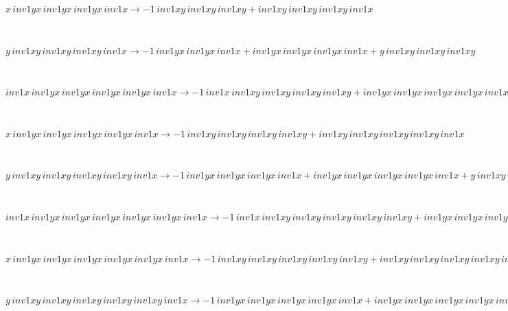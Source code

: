 \begin{minipage}{6in}
$
x\,
 inv1yx\,
 inv1yx\,
 inv1yx\,
 inv1x\rightarrow -1\,
 inv1xy\,
 inv1xy\,
 inv1xy + inv1xy\,
 inv1xy\,
 inv1xy\,
 inv1x
$
\end{minipage}\medskip \\
\begin{minipage}{6in}
$
y\,
 inv1xy\,
 inv1xy\,
 inv1xy\,
 inv1x\rightarrow -1\,
 inv1yx\,
 inv1yx\,
 inv1x + inv1yx\,
 inv1yx\,
 inv1yx\,
 inv1x + y\,
 inv1xy\,
 inv1xy\,
 inv1xy
$
\end{minipage}\medskip \\
\begin{minipage}{6in}
$
inv1x\,
 inv1yx\,
 inv1yx\,
 inv1yx\,
 inv1yx\,
 inv1x\rightarrow -1\,
 inv1x\,
 inv1xy\,
 inv1xy\,
 inv1xy\,
 inv1xy + inv1yx\,
 inv1yx\,
 inv1yx\,
 inv1yx\,
 inv1x + inv1x\,
 inv1xy\,
 inv1xy\,
 inv1xy\,
 inv1xy\,
 inv1x
$
\end{minipage}\medskip \\
\begin{minipage}{6in}
$
x\,
 inv1yx\,
 inv1yx\,
 inv1yx\,
 inv1yx\,
 inv1x\rightarrow -1\,
 inv1xy\,
 inv1xy\,
 inv1xy\,
 inv1xy + inv1xy\,
 inv1xy\,
 inv1xy\,
 inv1xy\,
 inv1x
$
\end{minipage}\medskip \\
\begin{minipage}{6in}
$
y\,
 inv1xy\,
 inv1xy\,
 inv1xy\,
 inv1xy\,
 inv1x\rightarrow -1\,
 inv1yx\,
 inv1yx\,
 inv1yx\,
 inv1x + inv1yx\,
 inv1yx\,
 inv1yx\,
 inv1yx\,
 inv1x + y\,
 inv1xy\,
 inv1xy\,
 inv1xy\,
 inv1xy
$
\end{minipage}\medskip \\
\begin{minipage}{6in}
$
inv1x\,
 inv1yx\,
 inv1yx\,
 inv1yx\,
 inv1yx\,
 inv1yx\,
 inv1x\rightarrow -1\,
 inv1x\,
 inv1xy\,
 inv1xy\,
 inv1xy\,
 inv1xy\,
 inv1xy + inv1yx\,
 inv1yx\,
 inv1yx\,
 inv1yx\,
 inv1yx\,
 inv1x + inv1x\,
 inv1xy\,
 inv1xy\,
 inv1xy\,
 inv1xy\,
 inv1xy\,
 inv1x
$
\end{minipage}\medskip \\
\begin{minipage}{6in}
$
x\,
 inv1yx\,
 inv1yx\,
 inv1yx\,
 inv1yx\,
 inv1yx\,
 inv1x\rightarrow -1\,
 inv1xy\,
 inv1xy\,
 inv1xy\,
 inv1xy\,
 inv1xy + inv1xy\,
 inv1xy\,
 inv1xy\,
 inv1xy\,
 inv1xy\,
 inv1x
$
\end{minipage}\medskip \\
\begin{minipage}{6in}
$
y\,
 inv1xy\,
 inv1xy\,
 inv1xy\,
 inv1xy\,
 inv1xy\,
 inv1x\rightarrow -1\,
 inv1yx\,
 inv1yx\,
 inv1yx\,
 inv1yx\,
 inv1x + inv1yx\,
 inv1yx\,
 inv1yx\,
 inv1yx\,
 inv1yx\,
 inv1x + y\,
 inv1xy\,
 inv1xy\,
 inv1xy\,
 inv1xy\,
 inv1xy
$
\end{minipage}\medskip \\
